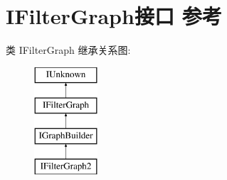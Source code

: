 \hypertarget{interface_i_filter_graph}{}\section{I\+Filter\+Graph接口 参考}
\label{interface_i_filter_graph}
类 I\+Filter\+Graph 继承关系图\+:\begin{figure}[H]
\begin{center}
\leavevmode
\includegraphics[height=4.000000cm]{interface_i_filter_graph}
\end{center}
\end{figure}

